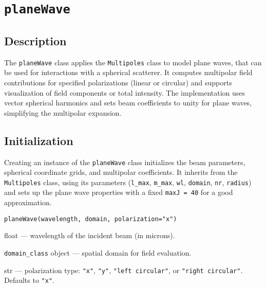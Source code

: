 \section{\texttt{planeWave}}

\subsection{Description}
The \texttt{planeWave} class applies the \texttt{Multipoles} class to model plane waves, that can be used for interactions with a spherical scatterer. It computes multipolar field contributions for specified polarizations (linear or circular) and supports visualization of field components or total intensity. The implementation uses vector spherical harmonics and sets beam coefficients to unity for plane waves, simplifying the multipolar expansion.

\subsection{Initialization}
Creating an instance of the \texttt{planeWave} class initializes the beam parameters, spherical coordinate grids, and multipolar coefficients. It inherits from the \texttt{Multipoles} class, using its parameters (\texttt{l\_max}, \texttt{m\_max}, \texttt{wl}, \texttt{domain}, \texttt{nr}, \texttt{radius}) and sets up the plane wave properties with a fixed \texttt{maxJ = 40} for a good approximation.

\begin{verbatim}
planeWave(wavelength, domain, polarization="x")
\end{verbatim}

\begin{description}[leftmargin=3cm]
    \item[wavelength:] float — wavelength of the incident beam (in microns).
    \item[domain:] \texttt{domain\_class} object — spatial domain for field evaluation.
    \item[polarization:] str — polarization type: \texttt{"x"}, \texttt{"y"}, \texttt{"left circular"}, or \texttt{"right circular"}. Defaults to \texttt{"x"}.
\end{description}

